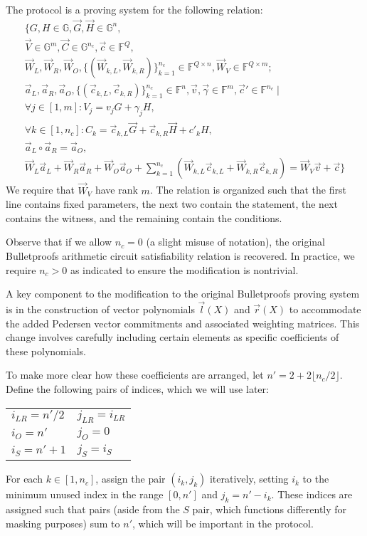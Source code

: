 \documentclass{article}
\newcommand{\GG}{\mathbb{G}}
\newcommand{\FF}{\mathbb{F}}
\newcommand{\mat}[1]{\vec{#1}}
\begin{document}
The protocol is a proving system for the following relation:
\begin{multline}
\label{eqn:relation}
\Biggl\{ G, H \in \GG, \vec{G}, \vec{H} \in \GG^n, \\
\vec{V} \in \GG^m, \vec{C} \in \GG^{n_c}, \vec{c} \in \FF^Q, \\
\mat{W}_L, \mat{W}_R, \mat{W}_O, \{ (\mat{W}_{k,L}, \mat{W}_{k,R}) \}_{k=1}^{n_c} \in \FF^{Q \times n}, \mat{W}_V \in \FF^{Q \times m} ; \\
\vec{a}_L, \vec{a}_R, \vec{a}_O, \{ (\vec{c}_{k,L}, \vec{c}_{k,R}) \}_{k=1}^{n_c} \in \FF^n, \vec{v}, \vec{\gamma} \in \FF^m, \vec{c}' \in \FF^{n_c} \mid \\
\forall j \in [1, m]: V_j = v_j G + \gamma_j H, \\
\forall k \in [1, n_c]: C_k = \vec{c}_{k,L} \vec{G} + \vec{c}_{k,R} \vec{H} + c'_k H, \\
\vec{a}_L \circ \vec{a}_R = \vec{a}_O, \\
\mat{W}_L \vec{a}_L + \mat{W}_R \vec{a}_R + \mat{W}_O \vec{a}_O + \sum_{k=1}^{n_c} \left( \mat{W}_{k,L} \vec{c}_{k,L} + \mat{W}_{k,R} \vec{c}_{k,R} \right) = \mat{W}_V \vec{v} + \vec{c} \Biggr\}
\end{multline}
We require that $\mat{W}_V$ have rank $m$.
The relation is organized such that the first line contains fixed parameters, the next two contain the statement, the next contains the witness, and the remaining contain the conditions.

Observe that if we allow $n_c = 0$ (a slight misuse of notation), the original Bulletproofs arithmetic circuit satisfiability relation is recovered.
In practice, we require $n_c > 0$ as indicated to ensure the modification is nontrivial.

A key component to the modification to the original Bulletproofs proving system is in the construction of vector polynomials $\vec{l}(X)$ and $\vec{r}(X)$ to accommodate the added Pedersen vector commitments and associated weighting matrices.
This change involves carefully including certain elements as specific coefficients of these polynomials.

To make more clear how these coefficients are arranged, let $n' = 2 + 2 \lfloor n_c / 2 \rfloor$.
Define the following pairs of indices, which we will use later:
\begin{center}
	\begin{tabular}{ll}
		$i_{LR} = n'/2$ & $j_{LR} = i_{LR}$ \\
		$i_O = n'$ & $j_O = 0$ \\
		$i_S = n' + 1$ & $j_S = i_S$
	\end{tabular}
\end{center}
For each $k \in [1, n_c]$, assign the pair $(i_k, j_k)$ iteratively, setting $i_k$ to the minimum unused index in the range $[0, n']$ and $j_k = n' - i_k$.
These indices are assigned such that pairs (aside from the $S$ pair, which functions differently for masking purposes) sum to $n'$, which will be important in the protocol.
\end{document}
